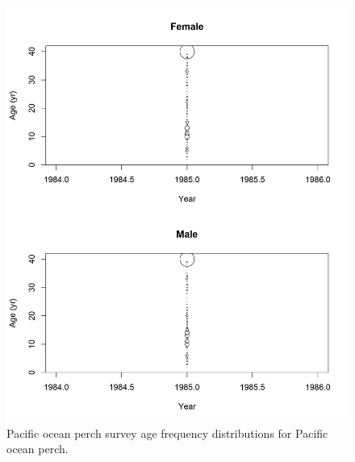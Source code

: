 \documentclass[12pt,]{article}
\begin{document}
\begin{figure}
\centering
\includegraphics{Figures/POP_ages.png}
\caption{Pacific ocean perch survey age frequency distributions for
Pacific ocean perch. \label{fig:POP_Age}}
\end{figure}
\end{document}
